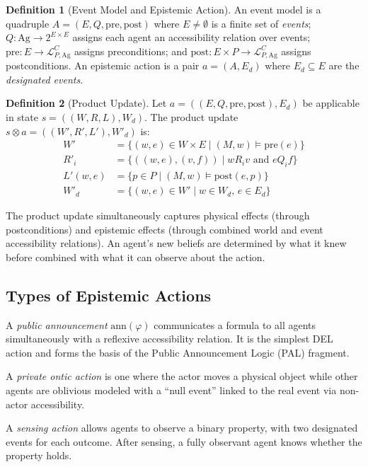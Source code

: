 \documentclass[12pt,a4paper]{article}
\theoremstyle{definition}
\newtheorem{definition}{Definition}[section]
\theoremstyle{plain}
\begin{document}
\begin{definition}[Event Model and Epistemic Action]
An event model is a quadruple $A = (E, Q, \mathrm{pre}, \mathrm{post})$ where $E \neq \emptyset$
is a finite set of \textit{events}; $Q : \mathrm{Ag} \to 2^{E \times E}$ assigns each agent an
accessibility relation over events; $\mathrm{pre} : E \to \mathcal{L}^C_{P,\mathrm{Ag}}$ assigns
preconditions; and $\mathrm{post} : E \times P \to \mathcal{L}^C_{P,\mathrm{Ag}}$ assigns
postconditions. An epistemic action is a pair $a = (A, E_d)$ where $E_d \subseteq E$ are the
\textit{designated events}.
\end{definition}

\begin{definition}[Product Update]
Let $a = ((E, Q, \mathrm{pre}, \mathrm{post}), E_d)$ be applicable in state
$s = ((W, R, L), W_d)$. The product update $s \otimes a = ((W', R', L'), W'_d)$ is:
\begin{align*}
W' &= \{(w, e) \in W \times E \mid (M, w) \models \mathrm{pre}(e)\} \\
R'_i &= \{((w, e), (v, f)) \mid w R_i v \text{ and } e Q_i f\} \\
L'(w, e) &= \{p \in P \mid (M, w) \models \mathrm{post}(e, p)\} \\
W'_d &= \{(w, e) \in W' \mid w \in W_d,\, e \in E_d\}
\end{align*}
\end{definition}

The product update simultaneously captures physical effects (through postconditions) and epistemic
effects (through combined world and event accessibility relations). An agent's new beliefs are
determined by what it knew before combined with what it can observe about the action.

\subsection{Types of Epistemic Actions}

A \textit{public announcement} $\mathrm{ann}(\varphi)$ communicates a formula to all agents
simultaneously with a reflexive accessibility relation. It is the simplest DEL action and forms
the basis of the Public Announcement Logic (PAL) fragment.

A \textit{private ontic action} is one where the actor moves a physical object while other agents
are oblivious modeled with a ``null event'' linked to the real event via non-actor accessibility.

A \textit{sensing action} allows agents to observe a binary property, with two designated events
for each outcome. After sensing, a fully observant agent knows whether the property holds.
\end{document}
